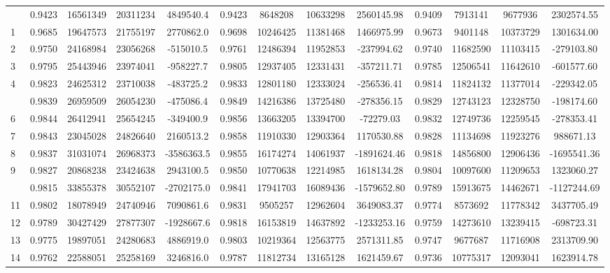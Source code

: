 \documentclass[
  12pt,
]{article}
\begin{document}
\begin{longtable}[t]{lcccccccccccc}
\endfoot
\bottomrule
\endlastfoot
0 & 0.9423 & 16561349 & 20311234 & 4849540.4 & 0.9423 & 8648208 & 10633298 & 2560145.98 & 0.9409 & 7913141 & 9677936 & 2302574.55\\
1 & 0.9685 & 19647573 & 21755197 & 2770862.0 & 0.9698 & 10246425 & 11381468 & 1466975.99 & 0.9673 & 9401148 & 10373729 & 1301634.00\\
2 & 0.9750 & 24168984 & 23056268 & -515010.5 & 0.9761 & 12486394 & 11952853 & -237994.62 & 0.9740 & 11682590 & 11103415 & -279103.80\\
3 & 0.9795 & 25443946 & 23974041 & -958227.7 & 0.9805 & 12937405 & 12331431 & -357211.71 & 0.9785 & 12506541 & 11642610 & -601577.60\\
4 & 0.9823 & 24625312 & 23710038 & -483725.2 & 0.9833 & 12801180 & 12333024 & -256536.41 & 0.9814 & 11824132 & 11377014 & -229342.05\\
\addlinespace
5 & 0.9839 & 26959509 & 26054230 & -475086.4 & 0.9849 & 14216386 & 13725480 & -278356.15 & 0.9829 & 12743123 & 12328750 & -198174.60\\
6 & 0.9844 & 26412941 & 25654245 & -349400.9 & 0.9856 & 13663205 & 13394700 & -72279.03 & 0.9832 & 12749736 & 12259545 & -278353.41\\
7 & 0.9843 & 23045028 & 24826640 & 2160513.2 & 0.9858 & 11910330 & 12903364 & 1170530.88 & 0.9828 & 11134698 & 11923276 & 988671.13\\
8 & 0.9837 & 31031074 & 26968373 & -3586363.5 & 0.9855 & 16174274 & 14061937 & -1891624.46 & 0.9818 & 14856800 & 12906436 & -1695541.36\\
9 & 0.9827 & 20868238 & 23424638 & 2943100.5 & 0.9850 & 10770638 & 12214985 & 1618134.28 & 0.9804 & 10097600 & 11209653 & 1323060.27\\
\addlinespace
10 & 0.9815 & 33855378 & 30552107 & -2702175.0 & 0.9841 & 17941703 & 16089436 & -1579652.80 & 0.9789 & 15913675 & 14462671 & -1127244.69\\
11 & 0.9802 & 18078949 & 24740946 & 7090861.6 & 0.9831 & 9505257 & 12962604 & 3649083.37 & 0.9774 & 8573692 & 11778342 & 3437705.49\\
12 & 0.9789 & 30427429 & 27877307 & -1928667.6 & 0.9818 & 16153819 & 14637892 & -1233253.16 & 0.9759 & 14273610 & 13239415 & -698723.31\\
13 & 0.9775 & 19897051 & 24280683 & 4886919.0 & 0.9803 & 10219364 & 12563775 & 2571311.85 & 0.9747 & 9677687 & 11716908 & 2313709.90\\
14 & 0.9762 & 22588051 & 25258169 & 3246816.0 & 0.9787 & 11812734 & 13165128 & 1621459.67 & 0.9736 & 10775317 & 12093041 & 1623914.78\\

\end{longtable}
\end{document}
